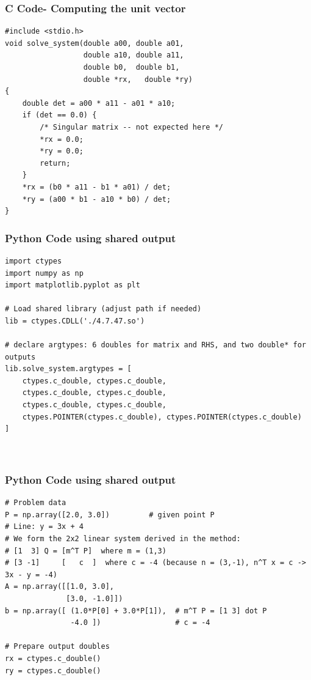 \documentclass{beamer}
\begin{document}
	\begin{frame}[fragile]
	\frametitle{C Code- Computing the unit vector}
	
	\begin{lstlisting}
#include <stdio.h>
void solve_system(double a00, double a01,
                  double a10, double a11,
                  double b0,  double b1,
                  double *rx,   double *ry)
{
    double det = a00 * a11 - a01 * a10;
    if (det == 0.0) {
        /* Singular matrix -- not expected here */
        *rx = 0.0;
        *ry = 0.0;
        return;
    }
    *rx = (b0 * a11 - b1 * a01) / det;
    *ry = (a00 * b1 - a10 * b0) / det;
}
	\end{lstlisting}
\end{frame}

\begin{frame}[fragile]
	\frametitle{Python Code using shared output}
	\begin{lstlisting}
import ctypes
import numpy as np
import matplotlib.pyplot as plt

# Load shared library (adjust path if needed)
lib = ctypes.CDLL('./4.7.47.so')

# declare argtypes: 6 doubles for matrix and RHS, and two double* for outputs
lib.solve_system.argtypes = [
    ctypes.c_double, ctypes.c_double,
    ctypes.c_double, ctypes.c_double,
    ctypes.c_double, ctypes.c_double,
    ctypes.POINTER(ctypes.c_double), ctypes.POINTER(ctypes.c_double)
]



	\end{lstlisting}
\end{frame}
\begin{frame}[fragile]
	\frametitle{Python Code using shared output}
	\begin{lstlisting}	
# Problem data
P = np.array([2.0, 3.0])         # given point P
# Line: y = 3x + 4
# We form the 2x2 linear system derived in the method:
# [1  3] Q = [m^T P]  where m = (1,3)
# [3 -1]     [   c  ]  where c = -4 (because n = (3,-1), n^T x = c -> 3x - y = -4)
A = np.array([[1.0, 3.0],
              [3.0, -1.0]])
b = np.array([ (1.0*P[0] + 3.0*P[1]),  # m^T P = [1 3] dot P
               -4.0 ])                 # c = -4

# Prepare output doubles
rx = ctypes.c_double()
ry = ctypes.c_double()


	\end{lstlisting}
\end{frame}
\end{document}
